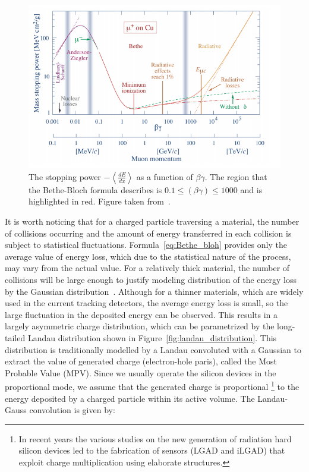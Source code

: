 \begin{figure}[h]
\centering
\includegraphics{figures/Bete_bloh.PNG}
\caption{ The stopping power $-\left< \frac{dE}{dx} \right>$ as a function of $\beta \gamma$. The region that the Bethe-Bloch formula describes is $0.1 \le (\beta \gamma) \le 1000$ and is highlighted in red. Figure taken from~\cite{PDG}.
\label{fig:Bethe_bloh}}
\end{figure}

It is worth noticing that for a charged particle traversing a material, the number of collisions occurring and the amount of energy transferred in each collision is subject to statistical fluctuations. Formula~\ref{eq:Bethe_bloh} provides only the average value of energy loss, which due to the statistical nature of the process, may vary from the actual value. 
For a relatively thick material, the number of collisions will be large enough to justify modeling distribution of the energy loss by the Gaussian distribution~\cite{gauss_sensor}. Although for a thinner materials, which are widely used in the current tracking detectors, the average energy loss is small, so the large fluctuation in the deposited energy can be observed.    
 This results in a largely asymmetric charge distribution, which can be parametrized by the long-tailed Landau distribution shown in Figure~\ref{fig:landau_distribution}.  This distribution is traditionally modelled by a Landau convoluted with a Gaussian to extract the value of generated charge (electron-hole paris), called the Most Probable Value (MPV). Since we usually operate the silicon devices in the proportional mode, we assume that the generated charge is proportional \footnote{In recent years the various studies on the new generation of radiation hard silicon devices led to the fabrication of sensors (LGAD and iLGAD) that exploit charge multiplication using elaborate structures.} to the energy deposited by a charged particle within its active volume. The Landau-Gauss convolution is given by:

